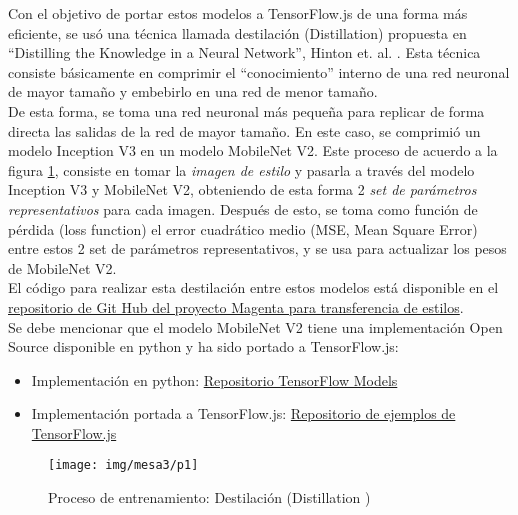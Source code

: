 Con el objetivo de portar estos modelos a TensorFlow.js de una forma más eficiente,
se usó una técnica
llamada destilación (Distillation) propuesta en ``Distilling the Knowledge in a Neural Network'', Hinton et. al. \cite{hintonDistillingKnowledgeNeural2015}.
Esta técnica consiste básicamente en comprimir el ``conocimiento'' interno de una red neuronal de mayor tamaño y embebirlo en una red de menor tamaño.\\
De esta forma, se toma una red neuronal más pequeña para replicar de forma directa las salidas de la red de mayor tamaño. En este caso, se comprimió un modelo Inception V3 en un modelo MobileNet V2.
Este proceso de acuerdo a la figura \ref{fig:destilacion}, consiste en tomar la \emph{imagen de estilo} y pasarla a través del modelo Inception V3 y MobileNet V2, obteniendo de esta forma 2 \emph{set de parámetros representativos} para cada imagen. Después de esto, se toma como función de pérdida (loss function) el
error cuadrático medio (MSE, Mean Square Error) entre estos 2 set de parámetros representativos, y se usa para actualizar los pesos de MobileNet V2.\\
El código para realizar esta destilación entre estos modelos está disponible en el \href{https://github.com/magenta/magenta/tree/master/magenta/models/arbitrary_image_stylization}{repositorio de Git Hub del proyecto Magenta para transferencia de estilos}.\\


Se debe mencionar que el modelo MobileNet V2 tiene una implementación Open Source disponible en python y ha sido portado a TensorFlow.js:
\begin{itemize}
  \item Implementación en python: \href{https://github.com/tensorflow/models/tree/master/research/slim/nets/mobilenet}{Repositorio TensorFlow Models}

  \item Implementación portada a TensorFlow.js: \href{https://github.com/tensorflow/tfjs-examples/tree/master/mobilenet}{Repositorio de ejemplos de TensorFlow.js}
\end{itemize}

\begin{figure}[H]
  \texttt{[image: img/mesa3/p1]}
  \centering
  \caption{Proceso de entrenamiento: Destilación (Distillation \cite{hintonDistillingKnowledgeNeural2015}) }
  \label{fig:destilacion}
\end{figure}





